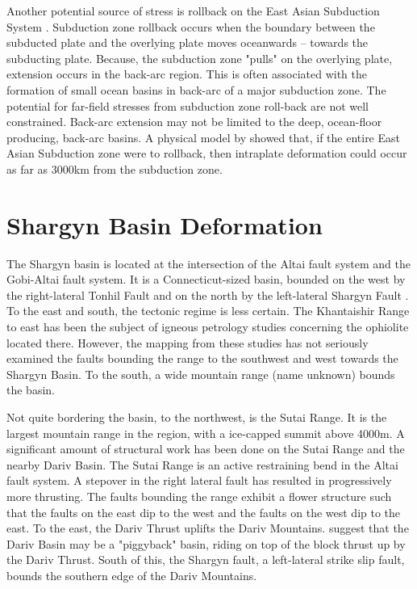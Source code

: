 \documentclass[10pt,a4paper]{article}
\begin{document}
	Another potential source of stress is rollback on the East Asian Subduction System \citep{Schellart2005}. Subduction zone rollback occurs when the boundary between the subducted plate and the overlying plate moves oceanwards -- towards the subducting plate. Because, the subduction zone "pulls" on the overlying plate, extension occurs in the back-arc region. This is often associated with the formation of small ocean basins in back-arc of a major subduction zone. The potential for far-field stresses from subduction zone roll-back are not well constrained. Back-arc extension may not be limited to the deep, ocean-floor producing, back-arc basins. A physical model by \citet{Schellart2005} showed that, if the entire East Asian Subduction zone were to rollback, then intraplate deformation could occur as far as 3000km from the subduction zone. 

\section*{Shargyn Basin Deformation}
	

	The Shargyn basin is located at the intersection of the Altai fault system and the Gobi-Altai fault system. It is a Connecticut-sized basin, bounded on the west by the right-lateral Tonhil Fault and on the north by the left-lateral Shargyn Fault \citep{Cunningham2003}. To the east and south, the tectonic regime is less certain. The  Khantaishir Range to east has been the subject of igneous petrology studies concerning the ophiolite located there. However, the mapping from these studies has not seriously examined the faults bounding the range to the southwest and west towards the Shargyn Basin.  To the south, a wide mountain range (name unknown) bounds the basin. 

	Not quite bordering the basin, to the northwest, is the Sutai Range. It is the largest mountain range in the region, with a ice-capped summit above 4000m. A significant amount of structural work has been done on the Sutai Range and the nearby Dariv Basin. The Sutai Range is an active restraining bend in the Altai fault system. A stepover in the right lateral fault has resulted in progressively more thrusting. The faults bounding the range exhibit a flower structure such that the faults on the east dip to the west and the faults on the west dip to the east\citep{Cunningham2003}. To the east, the Dariv Thrust uplifts the Dariv Mountains. \citep{Howard2006} suggest that the Dariv Basin may be a "piggyback" basin, riding on top of the block thrust up by the Dariv Thrust. South of this, the Shargyn fault, a left-lateral strike slip fault, bounds the southern edge of the Dariv Mountains. 
	
\end{document}
